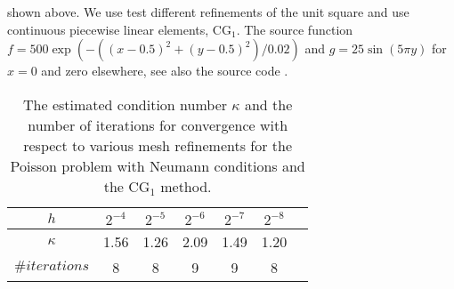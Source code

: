 shown above. We use test different refinements of the unit square and use
continuous piecewise linear elements, $\mathrm{CG}_1$. The source function $f= 500\exp(-((x-0.5)^2 + (y-0.5)^2)/0.02)$ and
$g =  25 \sin(5\pi y)$ for $x=0$ and zero elsewhere, see also the source code . 
\begin{table}
\begin{center}
\begin{tabular}{|c||c|c|c|c|c|c|}
\hline
$h$ & $2^{-4}$ & $2^{-5}$ & $2^{-6}$ & $2^{-7}$ & $2^{-8}$ \\ \hline 
$\kappa$ & 1.56 & 1.26 & 2.09 & 1.49 & 1.20 \\ \hline
$\#iterations$ & 8 & 8 & 9 & 9 & 8 \\ \hline 
\end{tabular}
\caption{The estimated condition number $\kappa$ and the number of iterations for 
  convergence with respect to various mesh refinements for the Poisson 
  problem with Neumann conditions and
  the $\mathrm{CG}_1$ method.}\label{tabel:neumann} 
\end{center}
\end{table}



